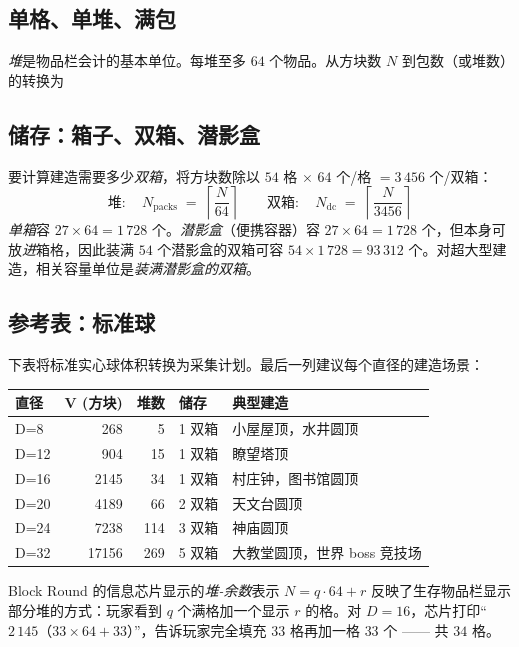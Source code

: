 \documentclass[12pt,a4paper]{scrartcl}
\begin{document}
\subsection{单格、单堆、满包}
\emph{堆}是物品栏会计的基本单位。每堆至多 $64$ 个物品。从方块数 $N$ 到包数（或堆数）的转换为

\subsection{储存：箱子、双箱、潜影盒}
要计算建造需要多少\emph{双箱}，将方块数除以 $54$ 格 $\times$ $64$ 个/格 $= 3\,456$ 个/双箱：
\[
\text{堆}:\quad N_{\mathrm{packs}} \;=\; \left\lceil \dfrac{N}{64} \right\rceil
\qquad
\text{双箱}:\quad N_{\mathrm{dc}} \;=\; \left\lceil \dfrac{N}{3456} \right\rceil
\]
\emph{单箱}容 $27 \times 64 = 1\,728$ 个。\emph{潜影盒}（便携容器）容 $27 \times 64 = 1\,728$ 个，但本身可放\emph{进}箱格，因此装满 $54$ 个潜影盒的双箱可容 $54 \times 1\,728 = 93\,312$ 个。对超大型建造，相关容量单位是\emph{装满潜影盒的双箱}。

\subsection{参考表：标准球}
下表将标准实心球体积转换为采集计划。最后一列建议每个直径的建造场景：
\nopagebreak

\vspace{0.4em}
\begin{center}
\small
\begin{tabularx}{\textwidth}{@{}lrrlX@{}}
\toprule
\textbf{直径} & \textbf{V (方块)} & \textbf{堆数} & \textbf{储存} & \textbf{典型建造} \\
\midrule
D=8   &   268 &  5  &  1 双箱 & 小屋屋顶，水井圆顶  \\
D=12  &   904 & 15  &  1 双箱 & 瞭望塔顶 \\
D=16  &  2145 & 34  &  1 双箱 & 村庄钟，图书馆圆顶 \\
D=20  &  4189 & 66  &  2 双箱 & 天文台圆顶 \\
D=24  &  7238 & 114 &  3 双箱 & 神庙圆顶 \\
D=32  & 17156 & 269 &  5 双箱 & 大教堂圆顶，世界 boss 竞技场 \\
\bottomrule
\end{tabularx}
\end{center}

Block Round 的信息芯片显示的\emph{堆-余数}表示 $N = q \cdot 64 + r$ 反映了生存物品栏显示部分堆的方式：玩家看到 $q$ 个满格加一个显示 $r$ 的格。对 $D=16$，芯片打印\enquote{$2\,145$（$33 \times 64 + 33$）}，告诉玩家完全填充 $33$ 格再加一格 $33$ 个 —— 共 $34$ 格。
\end{document}
